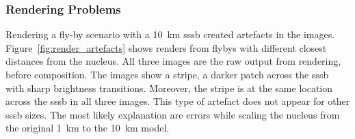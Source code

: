 \subsubsection{Rendering Problems} \label{sec:render_problems}
Rendering a fly-by scenario with a \SI{10}{\kilo\meter} \gls{sssb} created artefacts in the images. Figure~\ref{fig:render_artefacts} shows renders from flybys with different closest distances from the nucleus. All three images are the raw output from rendering, before composition. The images show a stripe, a darker patch across the \gls{sssb} with sharp brightness transitions. Moreover, the stripe is at the same location across the \gls{sssb} in all three images. This type of artefact does not appear for other \gls{sssb} sizes. The most likely explanation are errors while scaling the nucleus from the original \SI{1}{\kilo\meter} to the \SI{10}{\kilo\meter} model.
